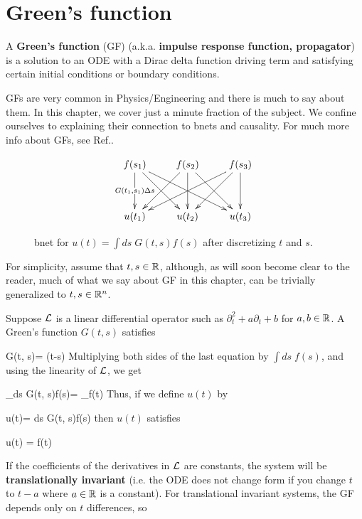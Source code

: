 \chapter{Green's function}
\label{ch-greens-fun}


A {\bf Green's function} (GF)
(a.k.a. {\bf impulse response
 function, propagator}) is a solution to an ODE 
 with a Dirac delta function driving term and satisfying certain
 initial conditions or boundary conditions. 
 
GFs are very common in Physics/Engineering and there is much
to say about them. In this chapter, we cover
just a minute fraction of the subject. We confine ourselves
to explaining their connection to bnets  and causality.
For much more info about GFs, see Ref.\cite{wiki-greens-fun}.

\begin{figure}[h!]
$$
\xymatrix@R=3pc{
f(s_1)\ar[d]|{G(t_1, s_1)\Delta s}
\ar[dr]\ar[drr]
&f(s_2)\ar[dl]\ar[d]\ar[dr]
&f(s_3)\ar[dll]\ar[dl]\ar[d]
\\
u(t_1)
&u(t_2)
&u(t_3)
}$$
\caption{bnet for 
$u(t)=  \int ds\; G(t, s)f(s)$
after discretizing $t$ and $s$.}
\label{eq-bnet-greens-fun}
\end{figure}

For simplicity, assume that $t, s\in { \mathbb{R}}$,
although, as will soon become clear to the reader,
much of what we say
about GF in this chapter,
can be trivially 
generalized to $t, s\in { \mathbb{R}}^n$.

Suppose ${\cal L}$ is a 
linear differential operator such as $\partial^2_t + a\partial_t + b$ for $a,b\in{ \mathbb{R}}$.
A Green's function $G(t,s)$ satisfies

\beq
\call G(t, s)= \delta(t-s)
\eeq
Multiplying both sides of the last equation by $\int ds\; f(s)$,
and using the linearity of ${\cal L}$, we get


\beq
{}_{\call\int ds\; G(t, s)f(s)}= 
_{f(t)}
\eeq
Thus, if we define $u(t)$ by

\beq
u(t)=  \int ds\; G(t, s)f(s)
\eeq
then $u(t)$ satisfies

\beq 
\call u(t) = f(t)
\eeq

If the coefficients of the derivatives in ${\cal L}$
are constants, the system will be {\bf translationally
invariant} (i.e. the ODE does not change
form if you change $t$ to $t-a$ where
$a\in{ \mathbb{R}}$ is a constant).
For translational invariant systems,
the GF depends only on $t$ differences, so

